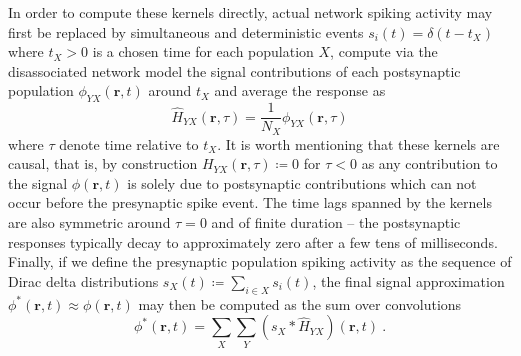In order to compute these kernels directly, 
actual network spiking activity may first be replaced by simultaneous and deterministic events 
$s_i(t) = \delta(t - t_X)$ where $t_X > 0$ is a chosen time for each population $X$, 
compute via the disassociated network model the signal contributions of each postsynaptic population $\phi_{YX}(\mathbf{r}, t)$ around $t_X$
and average the response as 
\begin{equation}
\hat{H}_{YX}(\mathbf{r}, \tau) = \frac{1}{N_X} \phi_{YX} (\mathbf{r}, \tau)
\end{equation}
where $\tau$ denote time relative to $t_X$. 
It is worth mentioning that these kernels are causal, that is, 
by construction $H_{YX}(\mathbf{r}, \tau) \coloneq 0$ for $\tau < 0$ as any contribution to the signal $\phi(\mathbf{r}, t)$ is solely due to postsynaptic contributions which can not occur before the presynaptic spike event. 
The time lags spanned by the kernels are also symmetric around $\tau=0$ and of finite duration -- 
the postsynaptic responses typically decay to approximately zero after a few tens of milliseconds. 
Finally, if we define the presynaptic population spiking activity as the sequence of Dirac delta distributions $s_X(t) \coloneq \sum_{i \in X} s_i(t)$, 
the final signal approximation $\phi^\ast(\mathbf{r}, t) \approx \phi(\mathbf{r}, t)$ may then be computed as the sum over convolutions
\begin{equation}
\phi^\ast(\mathbf{r}, t) = \sum_X \sum_Y \left(s_X \ast \hat{H}_{YX} \right)(\mathbf{r}, t)~. 
\end{equation}


\subsubsection{}
\label{sec:Schemes:populationmodels}


